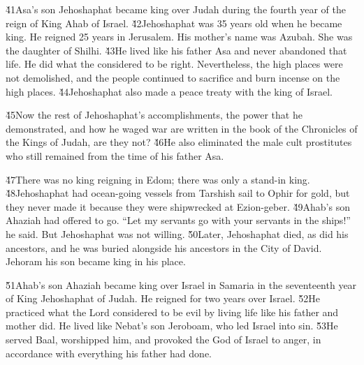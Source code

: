 \v{41}Asa's son Jehoshaphat became king over Judah during the fourth year of the reign of King Ahab of Israel. \v{42}Jehoshaphat was 35 years old when he became king. He reigned 25 years in Jerusalem. His mother's name was Azubah. She was the daughter of Shilhi. \v{43}He lived like his father Asa and never abandoned that life. He did what the  considered to be right. Nevertheless, the high places were not demolished, and the people continued to sacrifice and burn incense on the high places. \v{44}Jehoshaphat also made a peace treaty with the king of Israel.

\v{45}Now the rest of Jehoshaphat's accomplishments, the power that he demonstrated, and how he waged war are written in the book of the Chronicles of the Kings of Judah, are they not? \v{46}He also eliminated the male cult prostitutes who still remained from the time of his father Asa.

\v{47}There was no king reigning in Edom; there was only a stand-in king. \v{48}Jehoshaphat had ocean-going vessels from Tarshish sail to Ophir for gold, but they never made it because they were shipwrecked at Ezion-geber. \v{49}Ahab's son Ahaziah had offered to go. ``Let my servants go with your servants in the ships!'' he said. But Jehoshaphat was not willing. \v{50}Later, Jehoshaphat died, as did his ancestors, and he was buried alongside his ancestors in the City of David. Jehoram his son became king in his place.

\v{51}Ahab's son Ahaziah became king over Israel in Samaria in the seventeenth year of King Jehoshaphat of Judah. He reigned for two years over Israel. \v{52}He practiced what the Lord considered to be evil by living life like his father and mother did. He lived like Nebat's son Jeroboam, who led Israel into sin. \v{53}He served Baal, worshipped him, and provoked the  God of Israel to anger, in accordance with everything his father had done.
